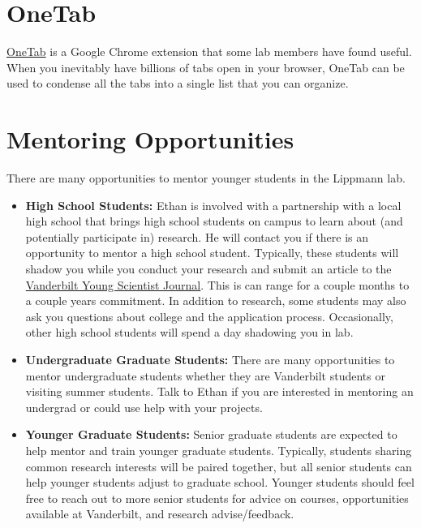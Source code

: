 \documentclass[
]{book}
\begin{document}
\hypertarget{onetab}{%
\section{OneTab}\label{onetab}}

\href{https://chrome.google.com/webstore/detail/onetab/chphlpgkkbolifaimnlloiipkdnihall?hl=en}{OneTab} is a Google Chrome extension that some lab members have found useful. When you inevitably have billions of tabs open in your browser, OneTab can be used to condense all the tabs into a single list that you can organize.

\hypertarget{mentoring-opportunities}{%
\section{Mentoring Opportunities}\label{mentoring-opportunities}}

There are many opportunities to mentor younger students in the Lippmann lab.

\begin{itemize}
\item
  \textbf{High School Students:} Ethan is involved with a partnership with a local high school that brings high school students on campus to learn about (and potentially participate in) research. He will contact you if there is an opportunity to mentor a high school student. Typically, these students will shadow you while you conduct your research and submit an article to the \href{https://www.youngscientistjournal.org/}{Vanderbilt Young Scientist Journal}. This is can range for a couple months to a couple years commitment. In addition to research, some students may also ask you questions about college and the application process. Occasionally, other high school students will spend a day shadowing you in lab.
\item
  \textbf{Undergraduate Graduate Students:} There are many opportunities to mentor undergraduate students whether they are Vanderbilt students or visiting summer students. Talk to Ethan if you are interested in mentoring an undergrad or could use help with your projects.
\item
  \textbf{Younger Graduate Students:} Senior graduate students are expected to help mentor and train younger graduate students. Typically, students sharing common research interests will be paired together, but all senior students can help younger students adjust to graduate school. Younger students should feel free to reach out to more senior students for advice on courses, opportunities available at Vanderbilt, and research advise/feedback.
\end{itemize}
\end{document}
